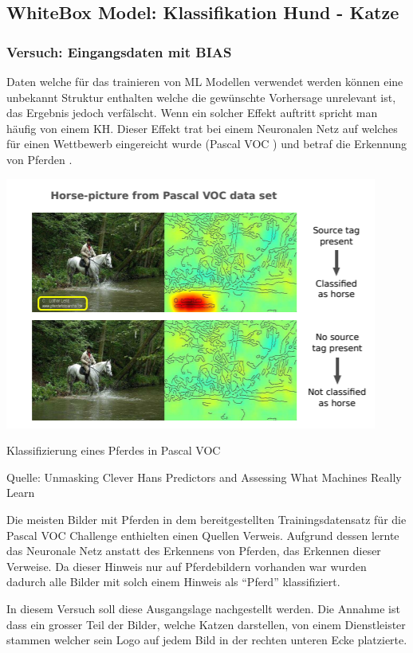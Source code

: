 \documentclass[
  12pt, %
  a4paper, %
  oneside, %
  openany, 
  numbers=noenddot, %
  BCOR=5mm, %
  parskip=half*, %
  thesis, %
]{bfhbook}
\begin{document}
\subsection{WhiteBox Model: Klassifikation Hund - Katze}

\subsubsection*{Versuch: Eingangsdaten mit BIAS}
Daten welche für das trainieren von \Gls{ML} Modellen verwendet werden können eine unbekannt Struktur enthalten welche die gewünschte Vorhersage unrelevant ist, das Ergebnis jedoch verfälscht. Wenn ein solcher Effekt auftritt spricht man häufig von einem \Gls{KH}. Dieser Effekt trat bei einem Neuronalen Netz auf welches für einen Wettbewerb eingereicht wurde (Pascal VOC \cite{Everingham_thepascal}) und betraf die Erkennung von Pferden \cite{Lapuschkin2019}. 

\begin{center}
\begin{minipage}[t]{0.45\linewidth}
\vspace{0pt}
\includegraphics[width=0.45\linewidth]{Bilder/HorsePredictionPascalVOC.PNG}
\caption{Klassifizierung eines Pferdes in Pascal VOC}
\caption*{Quelle: Unmasking Clever Hans Predictors and Assessing What Machines Really Learn \cite{Lapuschkin2019}}
\end{minipage}\hfill
\begin{minipage}[t]{0.45\linewidth}
\vspace{20pt}
Die meisten Bilder mit Pferden in dem bereitgestellten Trainingsdatensatz für die Pascal VOC Challenge enthielten einen Quellen Verweis. Aufgrund dessen lernte das Neuronale Netz anstatt des Erkennens von  Pferden, das Erkennen dieser Verweise. Da dieser Hinweis nur auf Pferdebildern vorhanden war wurden dadurch alle Bilder mit solch einem Hinweis als ``Pferd'' klassifiziert.
\end{minipage}
\end{center}

\break
In diesem Versuch soll diese Ausgangslage nachgestellt werden. Die Annahme ist dass ein grosser Teil der Bilder, welche Katzen darstellen, von einem Dienstleister stammen welcher sein Logo auf jedem Bild in der rechten unteren Ecke platzierte. 
\end{document}
